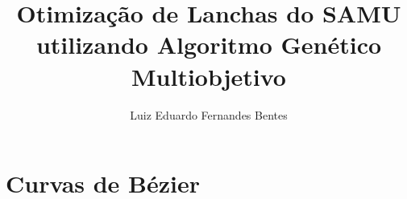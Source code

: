 \documentclass[]{article}
\title{Otimização de Lanchas do SAMU utilizando Algoritmo Genético Multiobjetivo}
\author{Luiz Eduardo Fernandes Bentes}
\begin{document}
\maketitle

\begin{abstract}

\end{abstract}
\section{Curvas de Bézier}
\end{document}
